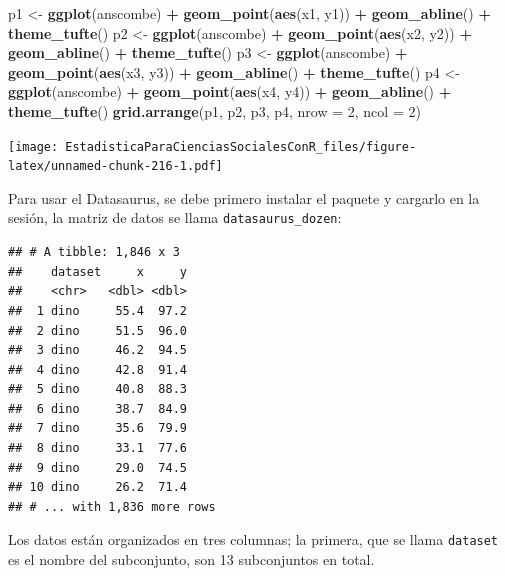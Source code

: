 \documentclass[]{book}
\newenvironment{Shaded}{\begin{snugshade}}{\end{snugshade}}
\newcommand{\DataTypeTok}[1]{\textcolor[rgb]{0.13,0.29,0.53}{#1}}
\newcommand{\DecValTok}[1]{\textcolor[rgb]{0.00,0.00,0.81}{#1}}
\newcommand{\KeywordTok}[1]{\textcolor[rgb]{0.13,0.29,0.53}{\textbf{#1}}}
\newcommand{\NormalTok}[1]{#1}
\newcommand{\OperatorTok}[1]{\textcolor[rgb]{0.81,0.36,0.00}{\textbf{#1}}}
\newcommand{\StringTok}[1]{\textcolor[rgb]{0.31,0.60,0.02}{#1}}
\begin{document}
\begin{Shaded}
\begin{Highlighting}[]
\NormalTok{p1 <-}\StringTok{ }\KeywordTok{ggplot}\NormalTok{(anscombe) }\OperatorTok{+}\StringTok{ }\KeywordTok{geom_point}\NormalTok{(}\KeywordTok{aes}\NormalTok{(x1, y1)) }\OperatorTok{+}\StringTok{ }\KeywordTok{geom_abline}\NormalTok{() }\OperatorTok{+}\StringTok{ }\KeywordTok{theme_tufte}\NormalTok{()}
\NormalTok{p2 <-}\StringTok{ }\KeywordTok{ggplot}\NormalTok{(anscombe) }\OperatorTok{+}\StringTok{ }\KeywordTok{geom_point}\NormalTok{(}\KeywordTok{aes}\NormalTok{(x2, y2)) }\OperatorTok{+}\StringTok{ }\KeywordTok{geom_abline}\NormalTok{() }\OperatorTok{+}\StringTok{ }\KeywordTok{theme_tufte}\NormalTok{()}
\NormalTok{p3 <-}\StringTok{ }\KeywordTok{ggplot}\NormalTok{(anscombe) }\OperatorTok{+}\StringTok{ }\KeywordTok{geom_point}\NormalTok{(}\KeywordTok{aes}\NormalTok{(x3, y3)) }\OperatorTok{+}\StringTok{ }\KeywordTok{geom_abline}\NormalTok{() }\OperatorTok{+}\StringTok{ }\KeywordTok{theme_tufte}\NormalTok{()}
\NormalTok{p4 <-}\StringTok{ }\KeywordTok{ggplot}\NormalTok{(anscombe) }\OperatorTok{+}\StringTok{ }\KeywordTok{geom_point}\NormalTok{(}\KeywordTok{aes}\NormalTok{(x4, y4)) }\OperatorTok{+}\StringTok{ }\KeywordTok{geom_abline}\NormalTok{() }\OperatorTok{+}\StringTok{ }\KeywordTok{theme_tufte}\NormalTok{()}
\KeywordTok{grid.arrange}\NormalTok{(p1, p2, p3, p4, }\DataTypeTok{nrow =} \DecValTok{2}\NormalTok{, }\DataTypeTok{ncol =} \DecValTok{2}\NormalTok{)}
\end{Highlighting}
\end{Shaded}

\texttt{[image: EstadisticaParaCienciasSocialesConR\_files/figure-latex/unnamed-chunk-216-1.pdf]}

Para usar el Datasaurus, se debe primero instalar el paquete y cargarlo en la sesión, la matriz de datos se llama \texttt{datasaurus\_dozen}:

\begin{verbatim}
## # A tibble: 1,846 x 3
##    dataset     x     y
##    <chr>   <dbl> <dbl>
##  1 dino     55.4  97.2
##  2 dino     51.5  96.0
##  3 dino     46.2  94.5
##  4 dino     42.8  91.4
##  5 dino     40.8  88.3
##  6 dino     38.7  84.9
##  7 dino     35.6  79.9
##  8 dino     33.1  77.6
##  9 dino     29.0  74.5
## 10 dino     26.2  71.4
## # ... with 1,836 more rows
\end{verbatim}

Los datos están organizados en tres columnas; la primera, que se llama \texttt{dataset} es el nombre del subconjunto, son 13 subconjuntos en total.
\end{document}

